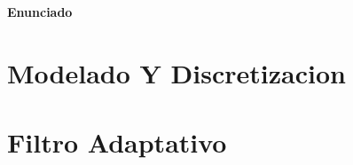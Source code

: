 \documentclass[10pt,a4paper]{article}
\begin{document}
		
	\setcounter{page}{1}

\begin{center}{\Large{\textbf{Enunciado}}}\end{center}
%	

	
	
	\section{Modelado Y Discretizacion}\label{sec:ej1}
	
		
	\section{Filtro Adaptativo}\label{sec:ej2}
	
%
%		
%
%		
%
%		
%
%		
%
%		
%
%		

\end{document}
